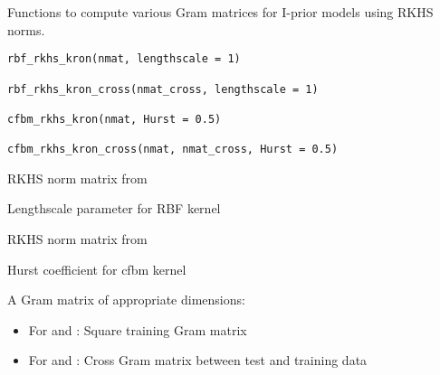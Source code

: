 \documentclass[a4paper]{book}
\begin{document}
%
\begin{Description}
Functions to compute various Gram matrices for I-prior models using RKHS norms.
\end{Description}
%
\begin{Usage}
\begin{verbatim}
rbf_rkhs_kron(nmat, lengthscale = 1)

rbf_rkhs_kron_cross(nmat_cross, lengthscale = 1)

cfbm_rkhs_kron(nmat, Hurst = 0.5)

cfbm_rkhs_kron_cross(nmat, nmat_cross, Hurst = 0.5)
\end{verbatim}
\end{Usage}
%
\begin{Arguments}
\begin{ldescription}
\item[\code{nmat}] RKHS norm matrix from 

\item[\code{lengthscale}] Lengthscale parameter for RBF kernel

\item[\code{nmat\_cross}] RKHS norm matrix from 

\item[\code{Hurst}] Hurst coefficient for cfbm kernel
\end{ldescription}
\end{Arguments}
%
\begin{Value}
A Gram matrix of appropriate dimensions:
\begin{itemize}

\item{} For  and : Square training Gram matrix
\item{} For  and : Cross Gram matrix between test and training data

\end{itemize}

\end{Value}
\end{document}
